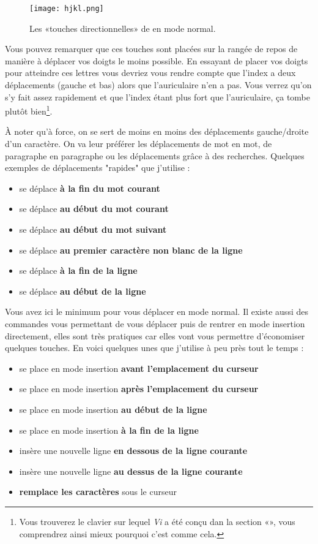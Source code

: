 \begin{figure}%
  \texttt{[image: hjkl.png]}
  \caption{Les «touches directionnelles» de \vim en mode normal.}
  \label{fig:vim-hjkl}
\end{figure}

Vous pouvez remarquer que ces touches sont placées sur la rangée de repos de manière à déplacer vos doigts le moins possible. En essayant de placer vos doigts pour atteindre ces lettres vous devriez vous rendre compte que l'index a deux déplacements (gauche et bas) alors que l'auriculaire n'en a pas. Vous verrez qu'on s'y fait assez rapidement et que l'index étant plus fort que l'auriculaire, ça tombe plutôt bien\footnote{Vous trouverez le clavier sur lequel \emph{Vi} a été conçu dan la section «», vous comprendrez ainsi mieux pourquoi c'est comme cela.}.

À noter qu'à force, on se sert de moins en moins des déplacements gauche/droite d'un caractère. On va leur préférer les déplacements de mot en mot, de paragraphe en paragraphe ou les déplacements grâce à des recherches. Quelques exemples de déplacements "rapides" que j'utilise :

\begin{itemize}
    \item \tte se déplace \textbf{à la fin du mot courant}
    \item \ttb se déplace \textbf{au début du mot courant}
    \item \ttw se déplace \textbf{au début du mot suivant}
    \item \tthat se déplace \textbf{au premier caractère non blanc de la ligne}
    \item \ttdollar se déplace \textbf{à la fin de la ligne}
    \item \ttzero se déplace \textbf{au début de la ligne}
\end{itemize}

Vous avez ici le minimum pour vous déplacer en mode normal. Il existe aussi des commandes vous permettant de vous déplacer puis de rentrer en mode insertion directement, elles sont très pratiques car elles vont vous permettre d'économiser quelques touches. En voici quelques unes que j'utilise à peu près tout le temps :

\begin{itemize}
    \item \tti se place en mode insertion \textbf{avant l'emplacement du curseur}
    \item \tta se place en mode insertion \textbf{après l'emplacement du curseur}
    \item \ttI se place en mode insertion \textbf{au début de la ligne}
    \item \ttA se place en mode insertion \textbf{à la fin de la ligne}
    \item \tto insère une nouvelle ligne \textbf{en dessous de la ligne courante}
    \item \ttO insère une nouvelle ligne \textbf{au dessus de la ligne courante}
    \item \ttr \textbf{remplace les caractères} sous le curseur
\end{itemize}

